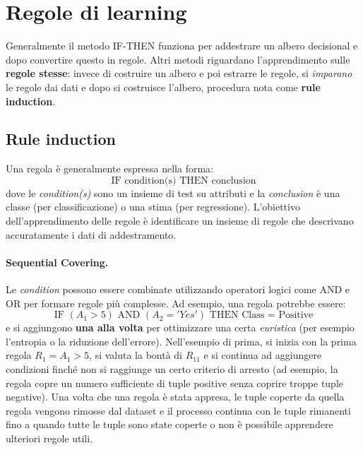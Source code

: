 \section{Regole di learning}
Generalmente il metodo IF-THEN funziona per addestrare un albero decisional e dopo convertire questo in regole. Altri metodi riguardano l'apprendimento sulle \textbf{regole stesse}: invece di costruire un albero e poi estrarre le regole, si \emph{imparano} le regole dai dati e dopo si costruisce l'albero, procedura nota come \textbf{rule induction}.

\subsection{Rule induction}
Una regola è generalmente espressa nella forma:
\[
\text{IF } \text{condition(s)} \text{ THEN } \text{conclusion}
\]
dove le \emph{condition(s)} sono un insieme di test su attributi e la \emph{conclusion} è una classe (per classificazione) o una stima (per regressione). L'obiettivo dell'apprendimento delle regole è identificare un insieme di regole che descrivano accuratamente i dati di addestramento.

\paragraph{Sequential Covering.}
Le \emph{condition} possono essere combinate utilizzando operatori logici come AND e OR per formare regole più complesse. Ad esempio, una regola potrebbe essere:
\[
\text{IF } (A_1 > 5) \text{ AND } (A_2 = 'Yes') \text{ THEN } \text{Class = Positive}
\]
e si aggiungono \textbf{una alla volta} per ottimizzare una certa \emph{euristica} (per esempio l'entropia o la riduzione dell'errore). Nell'esempio di prima, si inizia con la prima regola $R_1 = A_1 > 5$, si valuta la bontà di $R_11$ e si continua ad aggiungere condizioni finché non si raggiunge un certo criterio di arresto (ad esempio, la regola copre un numero sufficiente di tuple positive senza coprire troppe tuple negative). Una volta che una regola è stata appresa, le tuple coperte da quella regola vengono rimosse dal dataset e il processo continua con le tuple rimanenti fino a quando tutte le tuple sono state coperte o non è possibile apprendere ulteriori regole utili.

